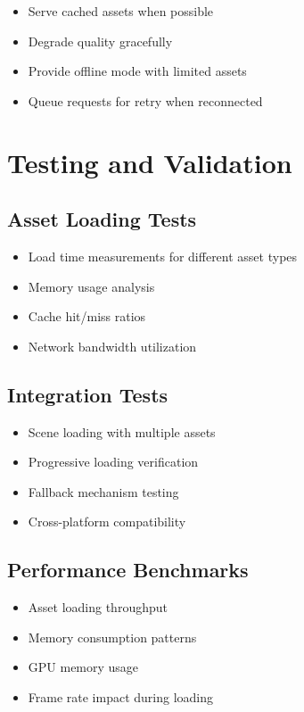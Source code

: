 \documentclass[12pt,a4paper]{article}
\begin{document}
\begin{itemize}
\item Serve cached assets when possible
\item Degrade quality gracefully
\item Provide offline mode with limited assets
\item Queue requests for retry when reconnected
\end{itemize}

\section{Testing and Validation}

\subsection{Asset Loading Tests}

\begin{itemize}
\item Load time measurements for different asset types
\item Memory usage analysis
\item Cache hit/miss ratios
\item Network bandwidth utilization
\end{itemize}

\subsection{Integration Tests}

\begin{itemize}
\item Scene loading with multiple assets
\item Progressive loading verification
\item Fallback mechanism testing
\item Cross-platform compatibility
\end{itemize}

\subsection{Performance Benchmarks}

\begin{itemize}
\item Asset loading throughput
\item Memory consumption patterns
\item GPU memory usage
\item Frame rate impact during loading
\end{itemize}
\end{document}
